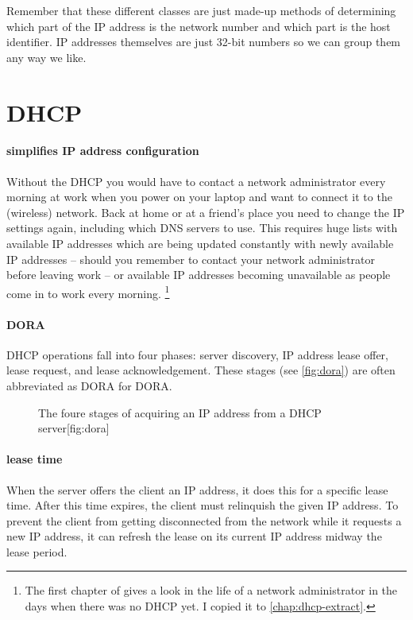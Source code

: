 Remember that these different classes are just made-up methods of determining which part of the \acs{IP} address is the network number and which part is the host identifier.
\acs{IP} addresses themselves are just 32-bit numbers so we can group them any way we like.


\section{\acl{DHCP}}
\label{sec:ip-dhcp}


\paragraph{simplifies \acs{IP} address configuration}
Without the \gls{DHCP} you would have to contact a network administrator every morning at work when you power on your laptop and want to connect it to the (wireless) network.
Back at home or at a friend's place you need to change the \acs{IP} settings again, including which \acs{DNS} servers to use.
This requires huge lists with available \acs{IP} addresses which are being updated constantly with newly available \acs{IP} addresses -- should you remember to contact your network administrator before leaving work -- or available \acs{IP} addresses becoming unavailable as people come in to work every morning.%
   \footnote{%
      The first chapter of \textcite[3-7]{droms} gives a look in the life of a network administrator in the days when there was no \acs{DHCP} yet.
      I copied it to \vref{chap:dhcp-extract}.
   }

\paragraph{\acs{DORA}}
\gls{DHCP} operations fall into four phases: server discovery, \acs{IP} address lease offer, lease request, and lease acknowledgement.
These stages (see \vref{fig:dora}) are often abbreviated as \acs{DORA} for \acl{DORA}.

\begin{figure}
\begin{sidecaption}{The foure stages of acquiring an \acs{IP} address from a \acs{DHCP} server}[fig:dora]
\centering

\end{sidecaption}
\end{figure}

\paragraph{lease time}
When the server offers the client an \acs{IP} address, it does this for a specific lease time.
After this time expires, the client must relinquish the given \acs{IP} address.
To prevent the client from getting disconnected from the network while it requests a new \acs{IP} address, it can refresh the lease on its current \acs{IP} address midway the lease period.

